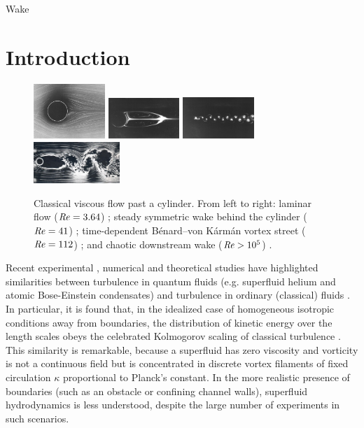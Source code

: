 \begin{chapter}{\label{cha:wake}Wake}
\section{Introduction}
\begin{figure}[h]
\centering
  \includegraphics[height=2.08cm,angle=180]{wake/3.png}
  \includegraphics[width=0.24\textwidth,angle=180]{wake/taneda41}
  \includegraphics[width=0.24\textwidth,angle=180]{wake/taneda112}
    \includegraphics[width=0.29\textwidth,angle=180]{wake/turb.jpg}
  \caption{Classical viscous flow past a cylinder. From left to right: laminar flow ($\mbox{\ensuremath{\mathit{Re}}}=3.64$) \cite{taneda41}; steady symmetric wake behind the cylinder ($\mbox{\ensuremath{\mathit{Re}}}=41$) \cite{taneda41}; time-dependent B\'enard--von K\'arm\'an vortex street ($\mbox{\ensuremath{\mathit{Re}}} = 112$) \cite{taneda112}; and chaotic downstream wake ($\mbox{\ensuremath{\mathit{Re}}} > 10^5$) \cite{nagib}.} 
  \label{fig:taneda-imgs}
\end{figure}
Recent experimental \cite{Tabeling,Salort}, 
numerical \cite{Nore,Kobayashi,Laurie} 
and theoretical studies \cite{Lvov}
have highlighted similarities between turbulence in quantum
fluids (e.g. superfluid helium and atomic Bose-Einstein condensates)
and turbulence in ordinary (classical) fluids \cite{Frisch}.
In particular, it is found that, in
the idealized case of homogeneous isotropic conditions away from
boundaries, the distribution of kinetic energy over the 
length scales obeys the celebrated Kolmogorov scaling of 
classical turbulence \cite{barenghi}. This similarity is remarkable,
because a superfluid has zero viscosity and vorticity is not a continuous
field but is concentrated in discrete vortex filaments of fixed 
circulation $\kappa$ proportional to Planck's constant. 
In the more realistic
presence of boundaries (such as an obstacle or confining channel
walls), superfluid hydrodynamics
is less understood, despite the large number of experiments in such scenarios. 


\end{chapter}
